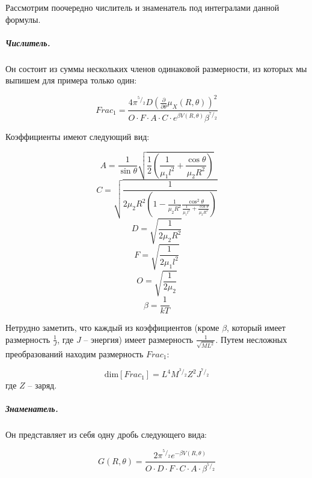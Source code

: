 Рассмотрим поочередно числитель и знаменатель под интегралами данной формулы.
\subparagraph{Числитель.}
Он состоит из суммы нескольких членов одинаковой размерности, из которых мы выпишем для примера только один:

\begin{displaymath}
Frac_1= \frac{4\pi^{^5\!/_2}D\left(\frac{\partial }{\partial \theta}\mu_X\left(R,\theta\right)\right)^2}{O\cdot F\cdot A\cdot C\cdot e^{\beta V(R,\theta)}\beta^{^7\!/_2}}
\end{displaymath}

Коэффициенты имеют следующий вид:
 
\begin{displaymath}
A=\frac{1}{\sin\theta}\sqrt{\frac{1}{2}\left( \frac{1}{\mu_1 l^2}+\frac{\cos\theta}{\mu_2R^2}  \right)}
\end{displaymath} 
\begin{displaymath}
C=\sqrt{\frac{1}{2\mu_2R^2\left( 1-\frac{1}{\mu_2R^2}\frac{\cos^2\theta}{\frac{1}{\mu_1 l^2}+\frac{\cos\theta}{\mu_2R^2} }  \right)}}
\end{displaymath}
\begin{displaymath}
D=\sqrt{\frac{1}{2\mu_2R^2}}
\end{displaymath}
\begin{displaymath}
F=\sqrt{\frac{1}{2\mu_1l^2}}
\end{displaymath}
\begin{displaymath}
O=\sqrt{\frac{1}{2\mu_2}}
\end{displaymath}
\begin{displaymath}
\beta=\frac{1}{kT}
\end{displaymath}

Нетрудно заметить, что каждый из коэффициентов (кроме $\beta$, который имеет размерность $\frac{1}{J}$, где $J$ -- энергия)  имеет размерность $\frac{1}{\sqrt{ML^2}}$. Путем несложных преобразований находим размерность $Frac_1$:

\begin{displaymath}
\text{dim}[Frac_1]=L^4M^{^3\!/_2}Z^2J^{^7\!/_2}
\end{displaymath}
где $Z$ -- заряд.

\subparagraph{Знаменатель.} Он представляет из себя одну дробь следующего вида:

\begin{displaymath}
G(R,\theta)= \frac{2\pi^{^5\!/_2} e^{-\beta V(R,\theta)}}{O\cdot D\cdot F\cdot C\cdot A\cdot\beta^{^5\!/_2}}
\end{displaymath}



